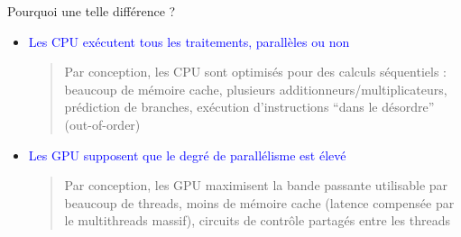 \documentclass[usenames,dvipsnames]{beamer}
\begin{document}
\begin{frame}
	Pourquoi une telle différence ?
	\vfill
	\begin{itemize}
		\item \textcolor{blue}{Les CPU exécutent tous les traitements, parallèles ou non}
		
	\vfill
		\begin{quote}
		Par conception, les CPU sont optimisés pour des calculs séquentiels : beaucoup de mémoire cache, plusieurs additionneurs/multiplicateurs, prédiction de branches, exécution d'instructions ``dans le désordre'' (out-of-order)
		 \end{quote}
	 
	 \vfill
		\item \textcolor{blue}{Les GPU supposent que le degré de parallélisme est élevé}
		
	\vfill
		\begin{quote}
        Par conception, les GPU maximisent la bande passante utilisable par beaucoup de threads, moins de mémoire cache (latence compensée par le multithreads massif), circuits de contrôle partagés entre les threads
   		\end{quote}
	
		
	\end{itemize}
\end{frame}
\end{document}
